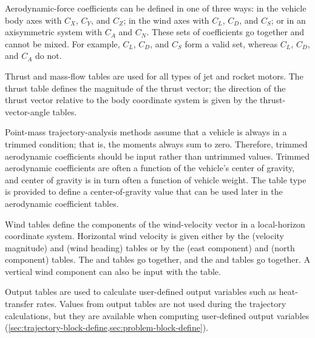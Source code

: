 Aerodynamic-force coefficients can be defined in one of three ways: in the vehicle
body axes with $C_X$, $C_Y$, and $C_Z$; in the wind axes with $C_L$, $C_D$, and
$C_S$; or in an axisymmetric system with $C_A$ and $C_N$. These sets of
coefficients go together and cannot be mixed. For example, $C_L$, $C_D$, and
$C_S$ form a valid set, whereas $C_L$, $C_D$, and $C_A$ do not.

Thrust and mass-flow tables are used for all types of jet and rocket motors. The
thrust table defines the magnitude of the thrust vector; the direction of the thrust
vector relative to the body coordinate system is given by the thrust-vector-angle
tables.

Point-mass trajectory-analysis methods assume that a vehicle is always in a trimmed
condition; that is, the moments always sum to zero. Therefore, trimmed aerodynamic
coefficients should be input rather than untrimmed values. Trimmed aerodynamic
coefficients are often a function of the vehicle's center of gravity, and center of
gravity is in turn often a function of vehicle weight. The  table type is
provided to define a center-of-gravity value that can be used later in the aerodynamic
coefficient tables.

Wind tables define the components of the wind-velocity vector in a local-horizon
coordinate system. Horizontal wind velocity is given either by the 
(velocity magnitude) and  (wind heading) tables or by the
 (east component) and  (north component)
tables. The  and  tables go together, and the
 and  tables go together. A vertical wind
component can also be input with the  table.

Output tables are used to calculate user-defined output variables such as heat-transfer
rates. Values from output tables are not used during the trajectory calculations, but
they are available when computing user-defined output variables
(\cref{sec:trajectory-block-define,sec:problem-block-define}).
